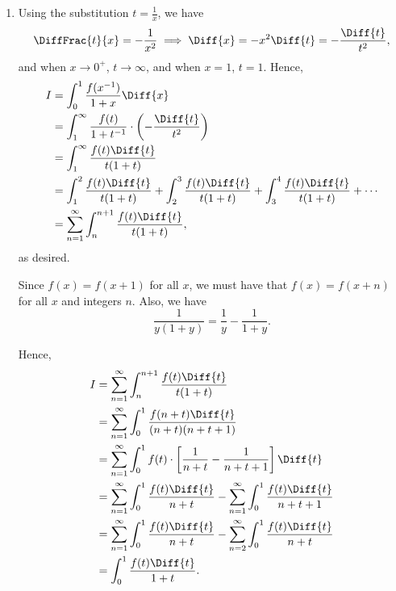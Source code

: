 \Question{\currfilebase}

\begin{enumerate}
    \item Using the substitution \(t = \frac{1}{x}\), we have
          \[
              \DiffFrac{t}{x} = - \frac{1}{x^2} \implies \Diff{x} = - x^2 \Diff{t} = - \frac{\Diff{t}}{t^2},
          \]
          and when \(x \to 0^{+}\), \(t \to \infty\), and when \(x = 1\), \(t = 1\). Hence,
          \begin{align*}
              I & = \int_{0}^{1} \frac{f(x^{-1})}{1 + x} \Diff{x}                                                                                                       \\
                & = \int_{1}^{\infty} \frac{f(t)}{1 + t^{-1}} \cdot \left(- \frac{\Diff{t}}{t^2}\right)                                                                 \\
                & = \int_{1}^{\infty} \frac{f(t) \Diff{t}}{t (1 + t)}                                                                                                   \\
                & = \int_{1}^{2} \frac{f(t) \Diff{t}}{t (1 + t)} + \int_{2}^{3} \frac{f(t) \Diff{t}}{t (1 + t)} + \int_{3}^{4} \frac{f(t) \Diff{t}}{t (1 + t)} + \cdots \\
                & = \sum_{n = 1}^{\infty} \int_{n}^{n + 1}\frac{f(t) \Diff{t}}{t (1 + t)},
          \end{align*}
          as desired.

          Since \(f(x) = f(x + 1)\) for all \(x\), we must have that \(f(x) = f(x + n)\) for all \(x\) and integers \(n\). Also, we have
          \[
              \frac{1}{y(1 + y)} = \frac{1}{y} - \frac{1}{1 + y}.
          \]

          Hence,
          \begin{align*}
              I & = \sum_{n = 1}^{\infty} \int_{n}^{n + 1} \frac{f(t) \Diff{t}}{t (1 + t)}                                                              \\
                & = \sum_{n = 1}^{\infty} \int_{0}^{1} \frac{f(n + t) \Diff{t}}{(n + t) (n + t + 1)}                                                    \\
                & = \sum_{n = 1}^{\infty} \int_{0}^{1} f(t) \cdot \left[\frac{1}{n + t} - \frac{1}{n + t + 1}\right] \Diff{t}                           \\
                & = \sum_{n = 1}^{\infty} \int_{0}^{1} \frac{f(t) \Diff{t}}{n + t} - \sum_{n = 1}^{\infty} \int_{0}^{1} \frac{f(t) \Diff{t}}{n + t + 1} \\
                & = \sum_{n = 1}^{\infty} \int_{0}^{1} \frac{f(t) \Diff{t}}{n + t} - \sum_{n = 2}^{\infty} \int_{0}^{1} \frac{f(t) \Diff{t}}{n + t}     \\
                & = \int_{0}^{1} \frac{f(t) \Diff{t}}{1 + t}.
          \end{align*}


\end{enumerate}
